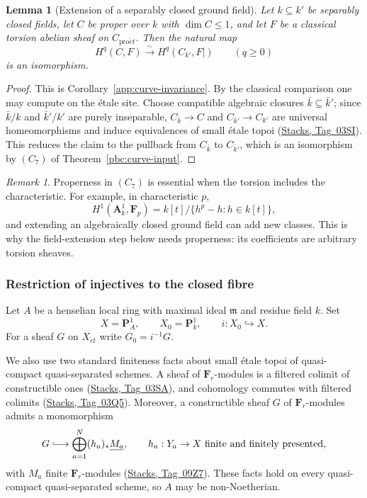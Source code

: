 \documentclass[11pt,a4paper]{article}
\numberwithin{equation}{section}
\newtheorem{lemma}[theorem]{Lemma}
\theoremstyle{definition}
\theoremstyle{remark}
\newtheorem{remark}[theorem]{Remark}
\newcommand{\et}{\acute{e}t}
\newcommand{\proet}{\mathrm{pro}\acute{e}t}
\newcommand{\stacks}[1]{\href{https://stacks.math.columbia.edu/tag/#1}{\textnormal{Stacks, Tag~#1}}}
\newcommand{\A}{\mathbf A}
\newcommand{\PP}{\mathbf P}
\begin{document}
\begin{lemma}[Extension of a separably closed ground field]
\label{pbc:curve-field-extension}
Let $k\subseteq k'$ be separably closed fields, let $C$ be proper over $k$
with $\dim C\leq1$, and let $F$ be a classical torsion abelian sheaf
on $C_{\proet}$. Then the natural map
\[
 H^q(C,F)\xrightarrow{\sim}H^q(C_{k'},F|)
 \qquad(q\geq0)
\]
is an isomorphism.
\end{lemma}
\begin{proof}
This is Corollary~\ref{app:curve-invariance}. By the classical
comparison one may compute on the \'etale site. Choose compatible
algebraic closures $\bar k\subseteq\bar k'$; since $\bar k/k$ and
$\bar k'/k'$ are purely inseparable, $C_{\bar k}\to C$ and
$C_{\bar k'}\to C_{k'}$ are universal homeomorphisms and induce
equivalences of small \'etale topoi (\stacks{03SI}). This reduces the
claim to the pullback from $C_{\bar k}$ to $C_{\bar k'}$, which is an
isomorphism by $(C_7)$ of Theorem~\ref{pbc:curve-input}.
\end{proof}

\begin{remark}
Properness in $(C_7)$ is essential when the torsion includes the
characteristic.  For example, in characteristic $p$,
\[
 H^1(\A^1_k,\mathbf F_p)
 =k[t]/\{h^p-h:h\in k[t]\},
\]
and extending an algebraically closed ground field can add new classes.
This is why the field-extension step below needs properness: its
coefficients are arbitrary torsion sheaves.
\end{remark}

\subsubsection{Restriction of injectives to the closed fibre}

Let $A$ be a henselian local ring with maximal ideal $\mathfrak m$ and
residue field $k$.  Set
\[
 X=\PP^1_A,\qquad X_0=\PP^1_k,\qquad i:X_0\hookrightarrow X.
\]
For a sheaf $G$ on $X_{\et}$ write $G_0=i^{-1}G$.

We also use two standard finiteness facts about small \'etale topoi of
quasi-compact quasi-separated schemes.  A sheaf of
$\mathbf F_r$-modules is a filtered colimit of constructible ones
(\stacks{03SA}), and cohomology commutes with filtered colimits
(\stacks{03Q5}).  Moreover, a constructible sheaf $G$ of
$\mathbf F_r$-modules admits a monomorphism
\begin{equation}
 G\lhook\joinrel\longrightarrow
 \bigoplus_{a=1}^N(h_a)_*\underline{M_a},
 \qquad h_a:Y_a\to X\ \text{finite and finitely presented},
 \label{pbc:constructible-finite-embedding}
\end{equation}
with $M_a$ finite $\mathbf F_r$-modules (\stacks{09Z7}). These facts
hold on every quasi-compact quasi-separated scheme, so $A$ may be
non-Noetherian.
\end{document}
